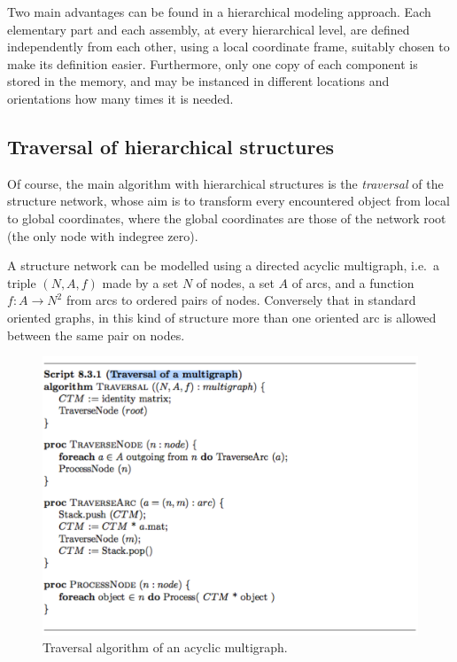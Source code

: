 \documentclass[11pt,oneside]{article}	%
\begin{document}
Two main advantages can be found in a hierarchical modeling approach. Each elementary part and each assembly, at every hierarchical level, are defined independently from each other, using a local coordinate frame, suitably chosen to make its definition easier. Furthermore, only one copy of each component is stored in the memory, and may be instanced in different locations and orientations how many times it is needed.

\subsection{Traversal of hierarchical structures}

Of course, the main algorithm with hierarchical structures is the \emph{traversal} of the structure network, whose aim is to transform every encountered object from local to global coordinates, where the global coordinates are those of the network root (the only node with indegree zero).

A structure network can be modelled using a directed acyclic multigraph, i.e.~a triple $(N,A,f)$
made by a set $N$ of nodes, a set $A$ of arcs, and a function $f:A \to N^2$ from arcs to ordered pairs of nodes. Conversely that in standard oriented graphs, in this kind of structure more than one oriented arc is allowed between the same pair on nodes.

\begin{figure}[htbp] %
   \centering
   \includegraphics[width=0.8\linewidth]{images/traversal} 
   \caption{Traversal algorithm of an acyclic multigraph.}
   \label{fig:traversal}
\end{figure}
\end{document}
